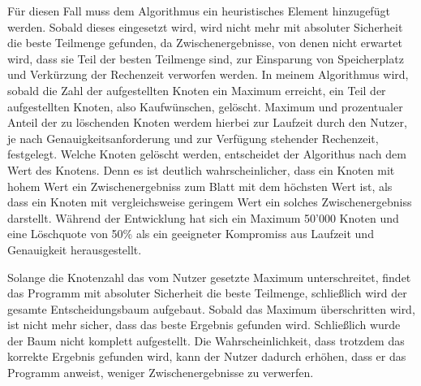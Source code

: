 Für diesen Fall muss dem Algorithmus ein heuristisches Element hinzugefügt werden. Sobald dieses eingesetzt wird, wird nicht mehr mit absoluter Sicherheit die beste Teilmenge gefunden, da Zwischenergebnisse, von denen nicht erwartet wird, dass sie Teil der besten Teilmenge sind, zur Einsparung von Speicherplatz und Verkürzung der Rechenzeit verworfen werden.
In meinem Algorithmus wird, sobald die Zahl der aufgestellten Knoten ein Maximum erreicht, ein Teil der aufgestellten Knoten, also Kaufwünschen, gelöscht. Maximum und prozentualer Anteil der zu löschenden Knoten werdem hierbei zur Laufzeit durch den Nutzer, je nach Genauigkeitsanforderung und zur Verfügung stehender Rechenzeit, festgelegt. Welche Knoten gelöscht werden, entscheidet der Algorithus nach dem Wert des Knotens. Denn es ist deutlich wahrscheinlicher, dass ein Knoten mit hohem Wert ein Zwischenergebniss zum Blatt mit dem höchsten Wert ist, als dass ein Knoten mit vergleichsweise geringem Wert ein solches Zwischenergebniss darstellt. Während der Entwicklung hat sich ein Maximum 50'000 Knoten und eine Löschquote von 50\% als ein geeigneter Kompromiss aus Laufzeit und Genauigkeit herausgestellt.

Solange die Knotenzahl das vom Nutzer gesetzte Maximum unterschreitet, findet das Programm mit absoluter Sicherheit die beste Teilmenge, schließlich wird der gesamte Entscheidungsbaum aufgebaut. Sobald das Maximum überschritten wird, ist nicht mehr sicher, dass das beste Ergebnis gefunden wird. Schließlich wurde der Baum nicht komplett aufgestellt. Die Wahrscheinlichkeit, dass trotzdem das korrekte Ergebnis gefunden wird, kann der Nutzer dadurch erhöhen, dass er das Programm anweist, weniger Zwischenergebnisse zu verwerfen.